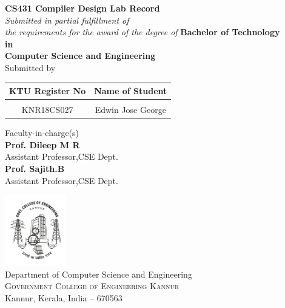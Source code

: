 \begin{titlepage}
	\clearpage
	\vspace*{\fill}
	\thispagestyle{empty}
	\begin{onehalfspace}
	\begin{center}
			
		\textup{\large{\bf CS431 Compiler Design Lab Record}}
		\\[0.2in]
		
       \small \emph{Submitted in partial fulfillment of\\ the requirements for the award of the degree of}
		\vspace{.2in}
		{\bf Bachelor of Technology \\in\\ Computer Science and Engineering}\\[0.5in]
		
		\normalsize Submitted by \\
		\begin{table}[h]
			\centering
			\begin{tabular}{cc}
				KTU Register No & Name of Student
				\\ \hline \\
				KNR18CS027      & Edwin Jose George
			\end{tabular}
		\end{table}
		
		\vspace{.1in}
		Faculty-in-charge(s)\\ [0.1in]
		\textbf{Prof. Dileep M R}\\ 
		Assistant Professor,CSE Dept.\\ [0.1in]
		\textbf{Prof. Sajith.B}\\
		Assistant Professor,CSE Dept. \\ [0.2in]
		
		\vfill
	
		\includegraphics[width=0.2\textwidth]{./gcek_logo.jpg}\\[0.1in]
		\Large{Department of Computer Science and Engineering}\\
		\normalsize \textsc{Government College of Engineering Kannur}\\ Kannur, Kerala, India -- 670563 \\
		\vspace{0.2cm}
	
	\end{center}
	\end{onehalfspace}
	\vspace*{\fill}
\end{titlepage}
